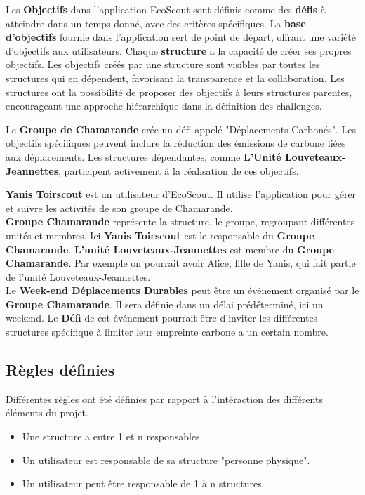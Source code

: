 Les \textbf{Objectifs} dans l'application EcoScout sont définis comme des \textbf{défis} 
à atteindre dans un temps donné, avec des critères spécifiques. La \textbf{base d'objectifs} 
fournie dans l'application sert de point de départ, offrant une variété d'objectifs aux utilisateurs. 
Chaque \textbf{structure} a la capacité de créer ses propres objectifs. Les objectifs créés par une 
structure sont visibles par toutes les structures qui en dépendent, favorisant la transparence et la collaboration. 
Les structures ont la possibilité de proposer des objectifs à leurs structures parentes, encourageant une approche hiérarchique dans la définition des challenges.

\begin{tcolorbox}[colback=white!2,
    colframe=black!60,
    title=\textbf{Exemple d'Objectif}
   ]
   Le \textbf{Groupe de Chamarande} crée un défi appelé "Déplacements Carbonés". 
   Les objectifs spécifiques peuvent inclure la réduction des émissions de carbone 
   liées aux déplacements. Les structures dépendantes, comme \textbf{L'Unité Louveteaux-Jeannettes}, 
   participent activement à la réalisation de ces objectifs.
\end{tcolorbox}


\begin{tcolorbox}[colback=white!2,
    colframe=black!60,
    title=\textbf{Exemple d'utilisation}
   ]
   \textbf{Yanis Toirscout} est un utilisateur d'EcoScout. Il utilise l'application 
    pour gérer et suivre les activités de son groupe de Chamarande.\\
    \newline
    \textbf{Groupe Chamarande} représente la structure, le groupe, regroupant différentes 
    unités et membres. Ici \textbf{Yanis Toirscout} est le responsable du \textbf{Groupe Chamarande}.
    \textbf{L'unité Louveteaux-Jeannettes} est membre du \textbf{Groupe Chamarande}. 
    Par exemple on pourrait avoir Alice, fille de Yanis, qui fait partie de l'unité Louveteaux-Jeannettes.\\
    \newline
    Le \textbf{Week-end Déplacements Durables} peut être un événement organisé par le \textbf{Groupe Chamarande}.
    Il sera définie dans un délai prédéterminé, ici un weekend. Le \textbf{Défi} de cet événement pourrait être 
    d'inviter les différentes structures spécifique à limiter leur empreinte carbone a un certain nombre.
\end{tcolorbox}




\subsection{Règles définies}
Différentes règles ont été définies par rapport à l'intéraction des différents éléments du projet.
\begin{itemize}
    \item Une structure a entre 1 et n responsables.
    \item Un utilisateur est responsable de sa structure "personne physique".
    \item Un utilisateur peut être responsable de 1 à n structures.
\end{itemize}


